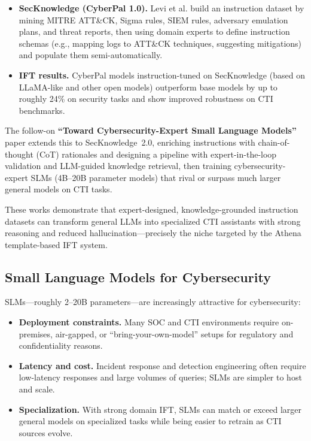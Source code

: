 \documentclass[10pt]{article}
\begin{document}
\begin{itemize}[leftmargin=*]
  \item \textbf{SecKnowledge (CyberPal 1.0).} Levi et al. build an instruction dataset by mining MITRE ATT\&CK, Sigma rules, SIEM rules, adversary emulation plans, and threat reports, then using domain experts to define instruction schemas (e.g., mapping logs to ATT\&CK techniques, suggesting mitigations) and populate them semi-automatically.\cite{levi2024cyberpal}
  \item \textbf{IFT results.} CyberPal models instruction-tuned on SecKnowledge (based on LLaMA-like and other open models) outperform base models by up to roughly 24\% on security tasks and show improved robustness on CTI benchmarks.\cite{levi2024cyberpal}
\end{itemize}

The follow-on \textbf{``Toward Cybersecurity-Expert Small Language Models''} paper extends this to SecKnowledge~2.0, enriching instructions with chain-of-thought (CoT) rationales and designing a pipeline with expert-in-the-loop validation and LLM-guided knowledge retrieval, then training cybersecurity-expert SLMs (4B--20B parameter models) that rival or surpass much larger general models on CTI tasks.\cite{levi2025toward}

These works demonstrate that expert-designed, knowledge-grounded instruction datasets can transform general LLMs into specialized CTI assistants with strong reasoning and reduced hallucination—precisely the niche targeted by the Athena template-based IFT system.

\subsection{Small Language Models for Cybersecurity}

SLMs---roughly 2--20B parameters---are increasingly attractive for cybersecurity:

\begin{itemize}[leftmargin=*]
  \item \textbf{Deployment constraints.} Many SOC and CTI environments require on-premises, air-gapped, or ``bring-your-own-model'' setups for regulatory and confidentiality reasons.
  \item \textbf{Latency and cost.} Incident response and detection engineering often require low-latency responses and large volumes of queries; SLMs are simpler to host and scale.
  \item \textbf{Specialization.} With strong domain IFT, SLMs can match or exceed larger general models on specialized tasks while being easier to retrain as CTI sources evolve.\cite{levi2025toward}
\end{itemize}
\end{document}
